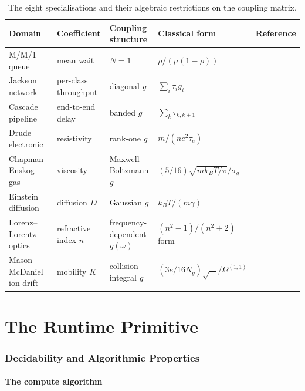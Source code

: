 \documentclass[twocolumn,11pt,a4paper]{article}
\newcommand{\lag}{\tau}
\newcommand{\cpl}{g}
\newcommand{\classcount}{N}
\begin{document}
\begin{table}[t]
\centering
\caption{The eight specialisations and their algebraic restrictions on the coupling matrix.}
\label{tab:specialisations}
\small
\begin{tabular}{lllll}
\toprule
Domain & Coefficient & Coupling structure & Classical form & Reference \\
\midrule
M/M/1 queue & mean wait & $\classcount = 1$ & $\rho/(\mu(1-\rho))$ & \citep{kleinrock1975} \\
Jackson network & per-class throughput & diagonal $\cpl$ & $\sum_i \lag_i \cpl_i$ & \citep{jackson1957,baskett1975} \\
Cascade pipeline & end-to-end delay & banded $\cpl$ & $\sum_k \lag_{k, k+1}$ & \citep{kleinrock1975} \\
Drude electronic & resistivity & rank-one $\cpl$ & $m / (n e^2 \tau_e)$ & \citep{drude1900,ashcroft1976} \\
Chapman--Enskog gas & viscosity & Maxwell--Boltzmann $\cpl$ & $(5/16)\sqrt{mk_BT/\pi}/\sigma_g$ & \citep{chapman1970} \\
Einstein diffusion & diffusion $D$ & Gaussian $\cpl$ & $k_B T / (m\gamma)$ & \citep{einstein1905brownian} \\
Lorenz--Lorentz optics & refractive index $n$ & frequency-dependent $\cpl(\omega)$ & $(n^2-1)/(n^2+2)$ form & \citep{lorenz1880,lorentz1880} \\
Mason--McDaniel ion drift & mobility $K$ & collision-integral $\cpl$ & $(3e/16N_g)\sqrt{\ldots}/\Omega^{(1,1)}$ & \citep{mason1988transport} \\
\bottomrule
\end{tabular}
\end{table}

\part{The Runtime Primitive}

\section{Decidability and Algorithmic Properties}
\label{sec:runtime}

\subsection{The compute algorithm}
\end{document}
